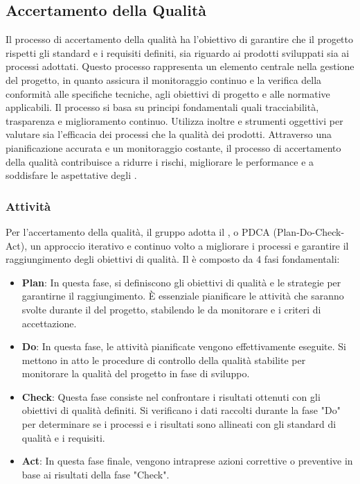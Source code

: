\subsection{Accertamento della Qualità}
\label{subsec:accertamento_qualità}
Il processo di accertamento della qualità ha l'obiettivo di garantire che il progetto rispetti gli standard e i requisiti definiti, sia riguardo ai prodotti sviluppati sia ai processi adottati. 
Questo processo rappresenta un elemento centrale nella gestione del progetto, in quanto assicura il monitoraggio continuo e la verifica della conformità alle specifiche tecniche, agli obiettivi di progetto e alle normative applicabili.
Il processo si basa su principi fondamentali quali tracciabilità, trasparenza e miglioramento continuo.
Utilizza inoltre  e strumenti oggettivi per valutare sia l'efficacia dei processi che la qualità dei prodotti.
Attraverso una pianificazione accurata e un monitoraggio costante, il processo di accertamento della qualità contribuisce a ridurre i rischi, migliorare le performance e a soddisfare le aspettative degli .
\subsubsection{Attività}
Per l'accertamento della qualità, il gruppo adotta il , o PDCA (Plan-Do-Check-Act), un approccio iterativo e continuo volto a migliorare i processi e garantire il raggiungimento degli obiettivi di qualità.
Il  è composto da 4 fasi fondamentali:
\begin{itemize}
    \item \textbf{Plan}: In questa fase, si definiscono gli obiettivi di qualità e le strategie per garantirne il raggiungimento.
    È essenziale pianificare le attività che saranno svolte durante il  del progetto, stabilendo le  da monitorare e i criteri di accettazione.
    \item \textbf{Do}: In questa fase, le attività pianificate vengono effettivamente eseguite.
    Si mettono in atto le procedure di controllo della qualità stabilite per monitorare la qualità del progetto in fase di sviluppo.
    \item \textbf{Check}: Questa fase consiste nel confrontare i risultati ottenuti con gli obiettivi di qualità definiti.
    Si verificano i dati raccolti durante la fase "Do" per determinare se i processi e i risultati sono allineati con gli standard di qualità e i requisiti.
    \item \textbf{Act}: In questa fase finale, vengono intraprese azioni correttive o preventive in base ai risultati della fase "Check".
\end{itemize}
